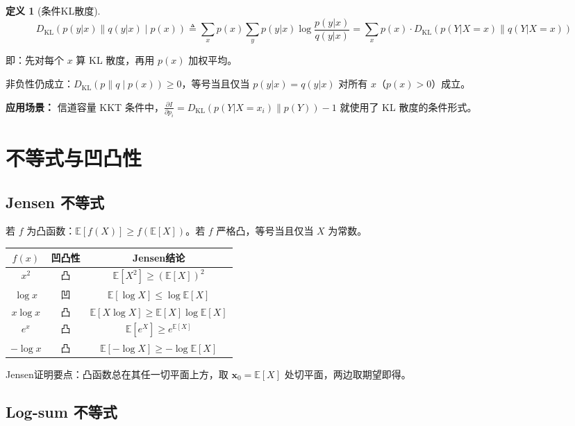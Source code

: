 \documentclass[12pt,a4paper]{ctexart}
\theoremstyle{definition}
\newtheorem{definition}[theorem]{定义}
\newcommand{\EE}{\mathbb{E}}
\newcommand{\DKL}{D_{\mathrm{KL}}}
\begin{document}
\begin{definition}[条件KL散度]
\[
\DKL(p(y|x) \| q(y|x) \mid p(x)) \triangleq \sum_x p(x) \sum_y p(y|x) \log\frac{p(y|x)}{q(y|x)}
= \sum_x p(x) \cdot \DKL(p(Y|X=x) \| q(Y|X=x))
\]

即：先对每个 $x$ 算 KL 散度，再用 $p(x)$ 加权平均。
\end{definition}

非负性仍成立：$\DKL(p\|q \mid p(x)) \geq 0$，等号当且仅当 $p(y|x) = q(y|x)$ 对所有 $x$（$p(x)>0$）成立。

\textbf{应用场景：} 信道容量 KKT 条件中，$\frac{\partial I}{\partial p_i} = \DKL(p(Y|X=x_i) \| p(Y)) - 1$ 就使用了 KL 散度的条件形式。

\section{不等式与凹凸性}

\subsection{Jensen 不等式}

若 $f$ 为凸函数：$\EE[f(X)] \geq f(\EE[X])$。若 $f$ 严格凸，等号当且仅当 $X$ 为常数。

\begin{keybox}[常用函数]
\begin{center}
\begin{tabular}{c|c|c}
\toprule
$f(x)$ & 凹凸性 & Jensen结论 \\
\midrule
$x^2$ & 凸 & $\EE[X^2] \geq (\EE[X])^2$ \\
$\log x$ & 凹 & $\EE[\log X] \leq \log \EE[X]$ \\
$x\log x$ & 凸 & $\EE[X\log X] \geq \EE[X]\log\EE[X]$ \\
$e^x$ & 凸 & $\EE[e^X] \geq e^{\EE[X]}$ \\
$-\log x$ & 凸 & $\EE[-\log X] \geq -\log\EE[X]$ \\
\bottomrule
\end{tabular}
\end{center}
\end{keybox}

Jensen证明要点：凸函数总在其任一切平面上方，取 $\bm{x}_0 = \EE[X]$ 处切平面，两边取期望即得。

\subsection{Log-sum 不等式}
\end{document}
